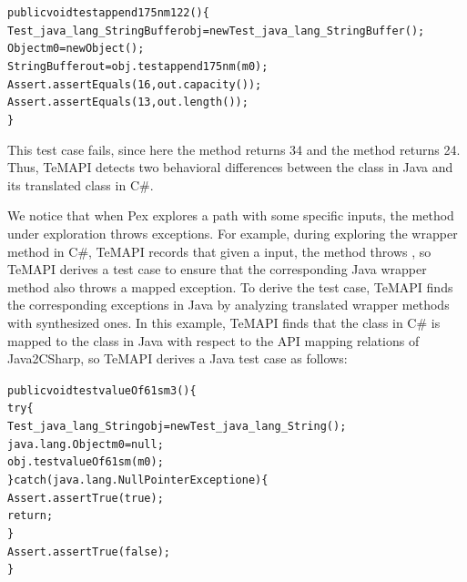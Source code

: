 \begin{CodeOut}%
\begin{alltt}
public void testappend175nm122()\{
  Test_java_lang_StringBuffer obj = new Test_java_lang_StringBuffer();
  Object m0 = new Object();
  StringBuffer out = obj.testappend175nm(m0);
  Assert.assertEquals(16, out.capacity());	
  Assert.assertEquals(13, out.length());
\}
\end{alltt}
\end{CodeOut}%

This test case fails, since here the  method returns 34 and the  method returns 24. Thus, TeMAPI detects two behavioral differences between the  class in Java and its translated class in C\#.


We notice that when Pex explores a path with some specific inputs, the method under exploration throws exceptions.
For example, during exploring the  wrapper method in C\#, TeMAPI records that given a  input, the method throws , so TeMAPI derives a test case to ensure that the corresponding Java wrapper method also throws a mapped exception. To derive the test case, TeMAPI finds the corresponding exceptions in Java by analyzing translated wrapper methods with synthesized ones. In this example, TeMAPI finds that the  class in C\# is mapped to the  class in Java with respect to the API mapping relations of Java2CSharp, so TeMAPI derives a Java test case as follows:

\begin{CodeOut}\vspace*{-1.5ex}
\begin{alltt}
 public void testvalueOf61sm3()\{
   try\{
     Test_java_lang_String obj = new Test_java_lang_String();
     java.lang.Object m0 = null;
     obj.testvalueOf61sm(m0);
   \}catch(java.lang.NullPointerException e)\{
     Assert.assertTrue(true);
     return;
   \}
   Assert.assertTrue(false);
 \}
\end{alltt}
\end{CodeOut}\vspace*{-1ex}

